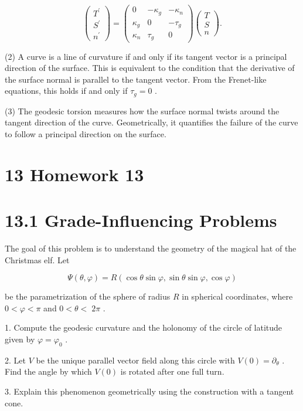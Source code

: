 \documentclass[10pt]{article}
\begin{document}
\[
\left( \begin{array}{l} {T}^{\prime } \\  {S}^{\prime } \\  {n}^{\prime } \end{array}\right)  = \left( \begin{matrix} 0 &  - {\kappa }_{g} &  - {\kappa }_{n} \\  {\kappa }_{g} & 0 &  - {\tau }_{g} \\  {\kappa }_{n} & {\tau }_{g} & 0 \end{matrix}\right) \left( \begin{array}{l} T \\  S \\  n \end{array}\right) .
\]

(2) A curve is a line of curvature if and only if its tangent vector is a principal direction of the surface. This is equivalent to the condition that the derivative of the surface normal is parallel to the tangent vector. From the Frenet-like equations, this holds if and only if \({\tau }_{g} = 0\) .

(3) The geodesic torsion measures how the surface normal twists around the tangent direction of the curve. Geometrically, it quantifies the failure of the curve to follow a principal direction on the surface.

\section*{13 Homework 13}

\section*{13.1 Grade-Influencing Problems}

\begin{problem}[title=PROBLEM 1 (6 POINTS)]
The goal of this problem is to understand the geometry of the magical hat of the Christmas elf. Let

\[
\Psi \left( {\theta ,\varphi }\right)  = R\left( {\cos \theta \sin \varphi ,\sin \theta \sin \varphi ,\cos \varphi }\right)
\]

be the parametrization of the sphere of radius \(R\) in spherical coordinates, where \(0 < \varphi  < \pi\) and \(0 < \theta  < \; {2\pi }\) .

1. Compute the geodesic curvature and the holonomy of the circle of latitude given by \(\varphi  = {\varphi }_{0}\) .

2. Let \(V\) be the unique parallel vector field along this circle with \(V\left( 0\right)  = {\partial }_{\theta }\) . Find the angle by which \(V\left( 0\right)\) is rotated after one full turn.

3. Explain this phenomenon geometrically using the construction with a tangent cone.
\end{problem}
\end{document}
